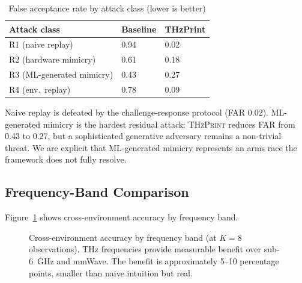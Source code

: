 \documentclass[sigconf,nonacm]{acmart}
\begin{document}
\begin{table}[h]
\caption{False acceptance rate by attack class (lower is better)}
\label{tab:adversarial}
\small
\begin{tabularx}{\columnwidth}{@{}p{2.6cm}X X@{}}
\toprule
\textbf{Attack class} & \textbf{Baseline} & \textbf{THzPrint} \\
\midrule
R1 (naive replay)        & 0.94 & 0.02 \\
R2 (hardware mimicry)    & 0.61 & 0.18 \\
R3 (ML-generated mimicry)& 0.43 & 0.27 \\
R4 (env.\ replay)        & 0.78 & 0.09 \\
\bottomrule
\end{tabularx}
\end{table}

Naive replay is defeated by the challenge-response protocol (FAR
0.02). ML-generated mimicry is the hardest residual attack:
\textsc{THzPrint} reduces FAR from 0.43 to 0.27, but a sophisticated
generative adversary remains a non-trivial threat. We are explicit
that ML-generated mimicry represents an arms race the framework does
not fully resolve.

\subsection{Frequency-Band Comparison}

Figure~\ref{fig:freq} shows cross-environment accuracy by frequency
band.

\begin{figure}[h]
\centering
{}
\caption{Cross-environment accuracy by frequency band (at $K=8$
  observations). THz frequencies provide measurable benefit over
  sub-6~GHz and mmWave. The benefit is approximately 5--10
  percentage points, smaller than naive intuition but real.}
\label{fig:freq}
\end{figure}
\end{document}
